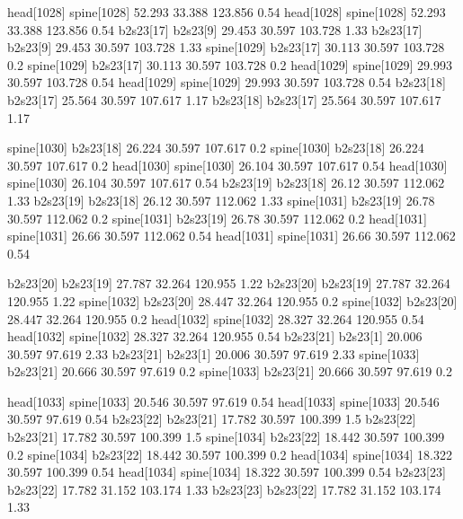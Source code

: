 head[1028]    spine[1028]    52.293    33.388    123.856    0.54
head[1028]    spine[1028]    52.293    33.388    123.856    0.54
b2s23[17]    b2s23[9]    29.453    30.597    103.728    1.33
b2s23[17]    b2s23[9]    29.453    30.597    103.728    1.33
spine[1029]    b2s23[17]    30.113    30.597    103.728    0.2
spine[1029]    b2s23[17]    30.113    30.597    103.728    0.2
head[1029]    spine[1029]    29.993    30.597    103.728    0.54
head[1029]    spine[1029]    29.993    30.597    103.728    0.54
b2s23[18]    b2s23[17]    25.564    30.597    107.617    1.17
b2s23[18]    b2s23[17]    25.564    30.597    107.617    1.17


spine[1030]    b2s23[18]    26.224    30.597    107.617    0.2
spine[1030]    b2s23[18]    26.224    30.597    107.617    0.2
head[1030]    spine[1030]    26.104    30.597    107.617    0.54
head[1030]    spine[1030]    26.104    30.597    107.617    0.54
b2s23[19]    b2s23[18]    26.12    30.597    112.062    1.33
b2s23[19]    b2s23[18]    26.12    30.597    112.062    1.33
spine[1031]    b2s23[19]    26.78    30.597    112.062    0.2
spine[1031]    b2s23[19]    26.78    30.597    112.062    0.2
head[1031]    spine[1031]    26.66    30.597    112.062    0.54
head[1031]    spine[1031]    26.66    30.597    112.062    0.54


b2s23[20]    b2s23[19]    27.787    32.264    120.955    1.22
b2s23[20]    b2s23[19]    27.787    32.264    120.955    1.22
spine[1032]    b2s23[20]    28.447    32.264    120.955    0.2
spine[1032]    b2s23[20]    28.447    32.264    120.955    0.2
head[1032]    spine[1032]    28.327    32.264    120.955    0.54
head[1032]    spine[1032]    28.327    32.264    120.955    0.54
b2s23[21]    b2s23[1]    20.006    30.597    97.619    2.33
b2s23[21]    b2s23[1]    20.006    30.597    97.619    2.33
spine[1033]    b2s23[21]    20.666    30.597    97.619    0.2
spine[1033]    b2s23[21]    20.666    30.597    97.619    0.2


head[1033]    spine[1033]    20.546    30.597    97.619    0.54
head[1033]    spine[1033]    20.546    30.597    97.619    0.54
b2s23[22]    b2s23[21]    17.782    30.597    100.399    1.5
b2s23[22]    b2s23[21]    17.782    30.597    100.399    1.5
spine[1034]    b2s23[22]    18.442    30.597    100.399    0.2
spine[1034]    b2s23[22]    18.442    30.597    100.399    0.2
head[1034]    spine[1034]    18.322    30.597    100.399    0.54
head[1034]    spine[1034]    18.322    30.597    100.399    0.54
b2s23[23]    b2s23[22]    17.782    31.152    103.174    1.33
b2s23[23]    b2s23[22]    17.782    31.152    103.174    1.33


